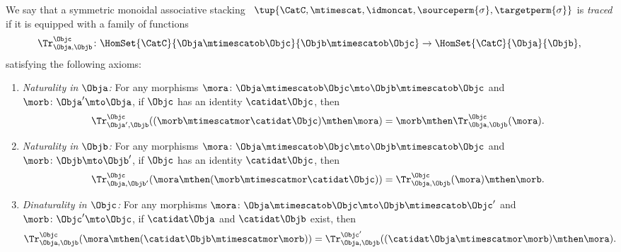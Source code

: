 {    \begin{widepar}
        \begin{ctdefinition}
            \label{def:traced-sym-strict-mon-scat}
            We say that a symmetric monoidal associative stacking ~$\tup{\CatC, \mtimescat, \idmoncat, \sourceperm{\sigma}, \targetperm{\sigma} }$ is \emph{traced} if it is equipped with a family of functions
            \begin{equation}
                \Tr_{\Obja,\Objb}^\Objc\colon \HomSet{\CatC}{\Obja \mtimescatob \Objc}{\Objb\mtimescatob \Objc}\to \HomSet{\CatC}{\Obja}{\Objb},
            \end{equation}
            satisfying the following axioms:
            \begin{enumerate}

                \item \emph{Naturality in $\Obja$:} For any morphisms $\mora\colon \Obja\mtimescatob \Objc \mto \Objb\mtimescatob \Objc$ and $\morb \colon \Obja' \mto \Obja$, if $\Objc$ has an identity $\catidat\Objc$, then
                      \begin{equation}
                          \Tr_{\Obja', \Objb}^\Objc ( (\morb \mtimescatmor \catidat\Objc) \mthen \mora) = \morb \mthen \Tr_{\Obja, \Objb}^\Objc (\mora).
                      \end{equation}

                \item \emph{Naturality in $\Objb$:}
                      For any morphisms $\mora\colon \Obja\mtimescatob \Objc \mto \Objb\mtimescatob \Objc$ and $\morb \colon \Objb \mto \Objb'$, if $\Objc$ has an identity $\catidat\Objc$, then
                      \begin{equation}
                          \Tr_{\Obja, \Objb'}^\Objc ( \mora \mthen (\morb \mtimescatmor \catidat\Objc) ) = \Tr_{\Obja, \Objb}^\Objc (\mora) \mthen \morb.
                      \end{equation}

                \item \emph{Dinaturality in $\Objc$:}
                      For any morphisms $\mora \colon \Obja \mtimescatob \Objc \mto \Objb \mtimescatob \Objc'$ and $\morb \colon \Objc' \mto \Objc$, if $\catidat\Obja$ and $\catidat\Objb$ exist, then
                      \begin{equation}
                          \Tr_{\Obja, \Objb}^{\Objc} (\mora \mthen (\catidat\Objb \mtimescatmor \morb)) = \Tr_{\Obja, \Objb}^{\Objc'}((\catidat\Obja \mtimescatmor \morb) \mthen \mora).
                      \end{equation}


\end{enumerate}
\end{ctdefinition}
\end{widepar}}
